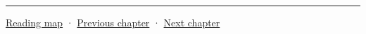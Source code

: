 \begin{center}\rule{0.5\linewidth}{0.5pt}\end{center}

\hyperref[volume-reading-map]{Reading map} · \hyperref[04-visual-computing-ii-ch037-gaussian-splatting-and-editable-captured-worlds]{Previous chapter} · \hyperref[04-visual-computing-ii-ch039-tiling-ordering-and-compositing-at-scale]{Next chapter}
